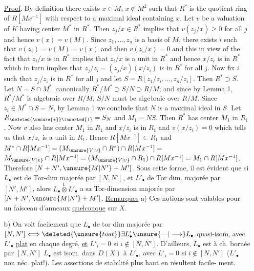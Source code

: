 \uline{Proof}. By definition there exists $x\in M$, $x\notin M^2$ such that
$R^*$ is the quotient ring of $R[Mx^{-1}]$ with respect to a maximal
ideal containing $x$. Let $v$ be a valuation of $K$ having center
$M^*$ in $R^*$. Then $z_j/x\in R^*$ implies that $v(z_j/x)\ge0$ for all
$j$ and hence $v(x)=v(M)$. Since $z_1,\ldots,z_n$ is a basis of $M$,
there exists $i$ such that $v(z_i)=v(M)=v(x)$ and then
$v(z_i/x)=0$ and this in view of the fact that $z_i/x$ is in $R^*$
implies that $z_i/x$ is a unit in $R^*$ and hence $x/z_i$ is in $R^*$
which in turn implies that $z_j/z_i=(z_j/x)(x/z_i)$ is in $R^*$ for
all $j$. Now fix $i$ such that $z_j/z_i$ is in $R^*$ for all $j$ and
let $S=R[z_1/z_i,\ldots,z_n/z_i]$. Then $R^*\supset S$. Let $N=S\cap M^*$.
 canonically $R^*/M^*\supset S/N\supset R/M$; and since by Lemma 1, $R^*/M^*$
is algebraic over $R/M$, $S/N$ must be algebraic over $R/M$. Since
$z_i\in M^*\cap S=N$, by Lemma 1 we conclude that $N$ is a maximal
ideal in $S$. Let $R_{\deleted{\unsure{*}}\inserted{1}}=S_N$ and $M_1=NS$. Then $R^*$ has center
$M_1$ in $R_1$. Now $v$ also has center $M_1$ in $R_1$ and $x/z_i$ is
in $R_1$ and $v(x/z_i)=0$ which tells us that $x/z_i$ is a unit in
$R_1$. Hence $R[Mx^{-1}]\subset R_1$ and $M^*\cap R[Mx^{-1}]=(M_{\unsure{V|v}}\cap R^*)\cap R[Mx^{-1}]=$
$M_{\unsure{V|v}}\cap R[Mx^{-1}]=(M_{\unsure{V|v}}\cap R_1)\cap R[Mx^{-1}]=M_1\cap R[Mx^{-1}]$. Therefore
\deleted{\unsure{$[N]$}} $[N+N',\unsure{M|N'}+M']$. Sous cette forme, il est
évident que si $L_\bullet$ est de Tor-dim
majorée par $[N,N']$, et $L'_\bullet$ de Tor dim.
majorée par $[N',M']$, alors $L_\bullet\overset{\mathbb L}{\otimes}L'_\bullet$ a sa
Tor-dimension majorée par $[N+N',\unsure{M|N'}+M']$.
\uline{Remarques} a) Ces notions sont valables pour un
faisceau d'anneaux \uline{quelconque} sur $X$.

b) On voit facilement que $L_\bullet$ de tor dim
majorée par $[N,N']\Longleftrightarrow\deleted{\unsure{tout}}\exists L'_\bullet\unsure{\text{---}|\longrightarrow}L_\bullet$
quasi-isom, avec $L'_\bullet$ \uline{plat} en chaque
degré, \uline{et} $L'_i=0$ si $i\notin[N,N']$. D'ailleurs,
$L_\bullet$ est à ch. bornée par $[N,N']$ 
 $L_\bullet$ est  isom. dans $D(X)$ à $L'_\bullet$,
avec \deleted{\unsure{$\exists$}} $L'_i=0$ si $i\notin[N,N']$
($L'_\bullet$ non néc. plat!). Les assertions de
stabilité plus haut en résultent facile-
ment.

